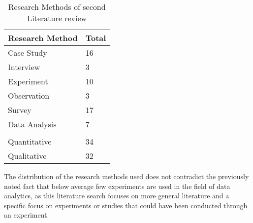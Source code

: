 
\begin{table}[htbp]
    \centering
    \begin{tabular}{ll}
    \hline
    \multicolumn{1}{|l|}{Research Method} & \multicolumn{1}{l|}{Total} \\ \hline
    \multicolumn{1}{|l|}{Case  Study}     & \multicolumn{1}{l|}{16}    \\ \hline
    \multicolumn{1}{|l|}{Interview}       & \multicolumn{1}{l|}{3}     \\ \hline
    \multicolumn{1}{|l|}{Experiment}      & \multicolumn{1}{l|}{10}    \\ \hline
    \multicolumn{1}{|l|}{Observation}     & \multicolumn{1}{l|}{3}     \\ \hline
    \multicolumn{1}{|l|}{Survey}          & \multicolumn{1}{l|}{17}    \\ \hline
    \multicolumn{1}{|l|}{Data Analysis}   & \multicolumn{1}{l|}{7}     \\ \hline
                                          &                            \\ \hline
    \multicolumn{1}{|l|}{Quantitative}    & \multicolumn{1}{l|}{34}    \\ \hline
    \multicolumn{1}{|l|}{Qualitative}     & \multicolumn{1}{l|}{32}    \\ \hline
    \end{tabular}
    \caption[Research Methods of second Literature review]{Research Methods of second Literature review}\label{tab:secondLiteratureSearch}
    \end{table}


The distribution of the research methods used does not contradict the previously noted fact that below average few experiments are used in the field of data analytics, as this literature search focuses on more general literature and a specific focus on experiments or studies that could have been conducted through an experiment.

